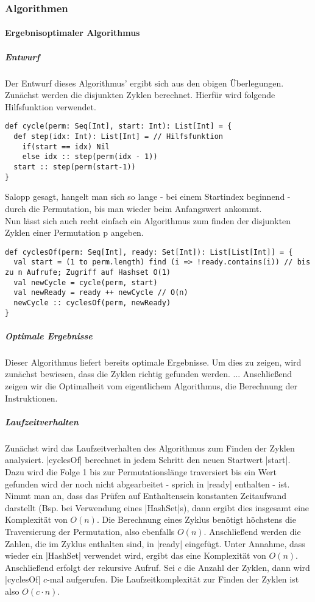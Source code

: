 \subsubsection{Algorithmen}
\paragraph{Ergebnisoptimaler Algorithmus}
\subparagraph{Entwurf}
Der Entwurf dieses Algorithmus' ergibt sich aus den obigen Überlegungen. Zunächst werden die disjunkten Zyklen berechnet.
Hierfür wird folgende Hilfsfunktion verwendet.
\lstset{language=Scala}
\lstset{basicstyle=\small}
\begin{lstlisting}
def cycle(perm: Seq[Int], start: Int): List[Int] = {
  def step(idx: Int): List[Int] = // Hilfsfunktion
    if(start == idx) Nil
    else idx :: step(perm(idx - 1))
  start :: step(perm(start-1))
}
\end{lstlisting}
Salopp gesagt, hangelt man sich so lange - bei einem Startindex beginnend - durch die Permutation, bis man wieder beim Anfangswert ankommt.\\
Nun lässt sich auch recht einfach ein Algorithmus zum finden der disjunkten Zyklen einer Permutation p angeben.
\lstset{language=Scala}
\lstset{basicstyle=\small}
\begin{lstlisting}
def cyclesOf(perm: Seq[Int], ready: Set[Int]): List[List[Int]] = {
  val start = (1 to perm.length) find (i => !ready.contains(i)) // bis zu n Aufrufe; Zugriff auf Hashset O(1)
  val newCycle = cycle(perm, start)
  val newReady = ready ++ newCycle // O(n)
  newCycle :: cyclesOf(perm, newReady)
}
\end{lstlisting}

\subparagraph{Optimale Ergebnisse}
Dieser Algorithmus liefert bereits optimale Ergebnisse. Um dies zu zeigen, wird zunächst bewiesen, dass die Zyklen richtig gefunden werden.
...
Anschließend zeigen wir die Optimalheit vom eigentlichem Algorithmus, die Berechnung der Instruktionen.
\subparagraph{Laufzeitverhalten}
Zunächst wird das Laufzeitverhalten des Algorithmus zum Finden der Zyklen analysiert.
|cyclesOf| berechnet in jedem Schritt den neuen Startwert |start|.
Dazu wird die Folge 1 bis zur Permutationslänge traversiert bis ein Wert gefunden wird der noch nicht abgearbeitet - sprich in |ready| enthalten - ist.
Nimmt man an, dass das Prüfen auf Enthaltensein konstanten Zeitaufwand darstellt (Bsp. bei Verwendung eines |HashSet|s), dann ergibt dies insgesamt eine Komplexität von $O(n)$.
Die Berechnung eines Zyklus benötigt höchstens die Traversierung der Permutation, also ebenfalls $O(n)$. %
Anschließend werden die Zahlen, die im Zyklus enthalten sind, in |ready| eingefügt. Unter Annahme, dass wieder ein |HashSet| verwendet wird, ergibt das eine Komplexität von $O(n)$.
Anschließend erfolgt der rekursive Aufruf. Sei $c$ die Anzahl der Zyklen, dann wird |cyclesOf| $c$-mal aufgerufen.
Die Laufzeitkomplexität zur Finden der Zyklen ist also $O(c \cdot n)$. \\

